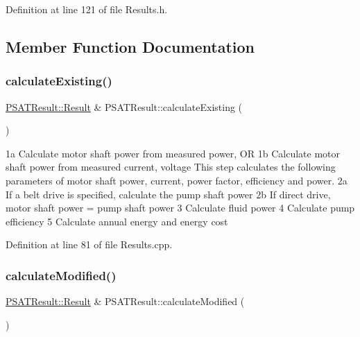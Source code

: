 Definition at line 121 of file Results.\+h.



\subsection{Member Function Documentation}
\mbox{\label{class_p_s_a_t_result_a83e8e621cdd75e6cf2a4d3f6e48bea11}} 
\subsubsection{\texorpdfstring{calculate\+Existing()}{calculateExisting()}}
{\footnotesize\ttfamily \hyperlink{struct_p_s_a_t_result_1_1_result}{P\+S\+A\+T\+Result\+::\+Result} \& P\+S\+A\+T\+Result\+::calculate\+Existing (\begin{DoxyParamCaption}{ }\end{DoxyParamCaption})}

1a Calculate motor shaft power from measured power, OR 1b Calculate motor shaft power from measured current, voltage This step calculates the following parameters of motor shaft power, current, power factor, efficiency and power. 2a If a belt drive is specified, calculate the pump shaft power 2b If direct drive, motor shaft power = pump shaft power 3 Calculate fluid power 4 Calculate pump efficiency 5 Calculate annual energy and energy cost

Definition at line 81 of file Results.\+cpp.

\mbox{\label{class_p_s_a_t_result_a1404ffd1e9420afd3ff4e9284d145646}} 
\subsubsection{\texorpdfstring{calculate\+Modified()}{calculateModified()}}
{\footnotesize\ttfamily \hyperlink{struct_p_s_a_t_result_1_1_result}{P\+S\+A\+T\+Result\+::\+Result} \& P\+S\+A\+T\+Result\+::calculate\+Modified (\begin{DoxyParamCaption}{ }\end{DoxyParamCaption})}

